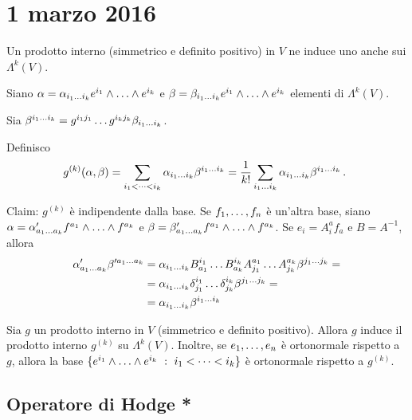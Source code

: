 \chapter{1 marzo 2016}

Un prodotto interno (simmetrico e definito positivo) in $V$ ne induce uno anche sui $\Lambda^k(V)$.

Siano $\alpha = \alpha_{\seqb ik{}} e^{i_1}\wedge\ldots\wedge e^{i_k}$ e $\beta = \beta_{\seqb ik{}} e^{i_1}\wedge\ldots\wedge e^{i_k}$ elementi di $\Lambda^k(V)$.

Sia $\beta^{\seqb ik{}} = g^{i_1j_1}\ldots g^{i_kj_k} \beta_{\seqb ik{}}$.

Definisco
\begin{equation*}
	g^{(k)} (\alpha,\beta) = \sum_{\seqb ik<} \alpha_{\seqb ik{}} \beta^{\seqb ik{}} 
	= \frac 1{k!} \sum_{\seqb ik{}} \alpha_{\seqb ik{}} \beta^{\seqb ik{}} \punto
\end{equation*}

Claim: $g^{(k)}$ è indipendente dalla base.
Se $\seqb fn,$ è un'altra base, siano $\alpha = \alpha'_{\seqb ak{}} f^{a_1}\wedge\ldots\wedge f^{a_k}$ e $\beta = \beta'_{\seqb ak{}} f^{a_1}\wedge\ldots\wedge f^{a_k}$. Se $e_i =  A^a_i f_a$ e $B=A^{-1}$, allora
\begin{align*}
	\alpha'_{\seqb ak{}} \beta'^{\seqb ak{}} &= \alpha_{\seqb ik{}} B^{i_1}_{a_1}\ldots B^{i_k}_{a_k} A^{a_1}_{j_1}\ldots A^{a_k}_{j_k} \beta^{\seqb jk{}}= \\
	&= \alpha_{\seqb ik{}} \delta^{i_1}_{j_1}\ldots \delta^{i_k}_{j_k}\beta^{\seqb jk{}} = \\
	&=\alpha_{\seqb ik{}} \beta^{\seqb ik{}}
\end{align*}

\begin{proposition}
	Sia $g$ un prodotto interno in $V$ (simmetrico e definito positivo). Allora $g$ induce il prodotto interno $g^{(k)}$ su $\Lambda^k(V)$. Inoltre, se $\seqb en,$ è ortonormale rispetto a $g$, allora la base $\{e^{i_1}\wedge\ldots\wedge e^{i_k} \suchthat \seqb ik< \}$ è ortonormale rispetto a $g^{(k)}$.
\end{proposition}

\section{Operatore di Hodge *}


